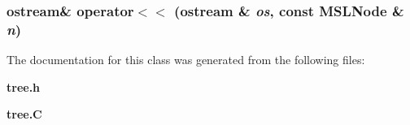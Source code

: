 \subsubsection{\setlength{\rightskip}{0pt plus 5cm}ostream\& operator$<$$<$ (ostream \& {\em os}, const MSLNode \& {\em n})\hspace{0.3cm}{\tt  [friend]}}\label{classMSLNode_l1}




The documentation for this class was generated from the following files:\begin{CompactItemize}
\item 
{\bf tree.h}\item 
{\bf tree.C}\end{CompactItemize}
